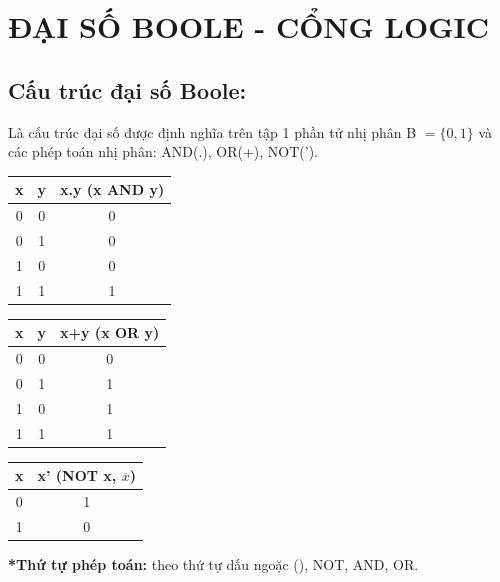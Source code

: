 \section{ĐẠI SỐ BOOLE - CỔNG LOGIC}
\subsection{Cấu trúc đại số Boole:}
Là cấu trúc đại số được định nghĩa trên tập 1 phần tử nhị phân B $=\lbrace 0,1\rbrace$ và các phép toán nhị phân: AND(.), OR(+), NOT(').
\begin{table}[h!]
    \centering
    \begin{tabular}{|cc|c|}
    \hline
    \textbf{x} & \textbf{y} & \textbf{x.y (x AND y)} \\ \hline
    0          & 0          & 0                      \\
    0          & 1          & 0                      \\
    1          & 0          & 0                      \\
    1          & 1          & 1                      \\ \hline
    \end{tabular}
    \qquad \qquad
    \begin{tabular}{|cc|c|}
    \hline
    \textbf{x} & \textbf{y} & \textbf{x+y (x OR y)} \\ \hline
    0          & 0          & 0                     \\
    0          & 1          & 1                     \\
    1          & 0          & 1                     \\
    1          & 1          & 1                     \\ \hline
    \end{tabular}
\end{table}
\begin{table}[h!]
    \centering
    \begin{tabular}{|c|c|}
    \hline
    \textbf{x} & \textbf{x' (NOT x, $\overline{x}$)} \\ \hline
    0          & 1                                   \\
    1          & 0                                   \\ \hline
    \end{tabular}
\end{table}

\textbf{*Thứ tự phép toán:} theo thứ tự dấu ngoặc (), NOT, AND, OR.
